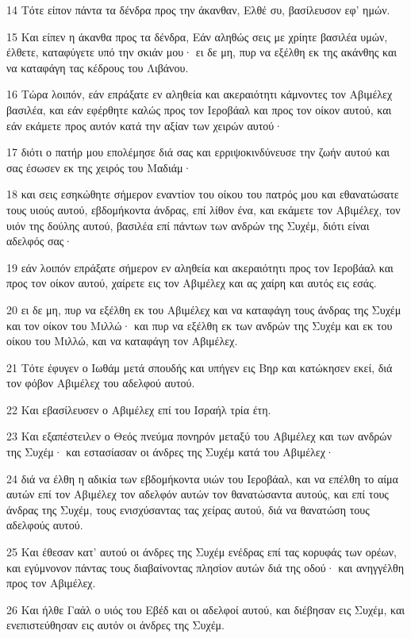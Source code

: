 \par 14 Τότε είπον πάντα τα δένδρα προς την άκανθαν, Ελθέ συ, βασίλευσον εφ' ημών.
\par 15 Και είπεν η άκανθα προς τα δένδρα, Εάν αληθώς σεις με χρίητε βασιλέα υμών, έλθετε, καταφύγετε υπό την σκιάν μου· ει δε μη, πυρ να εξέλθη εκ της ακάνθης και να καταφάγη τας κέδρους του Λιβάνου.
\par 16 Τώρα λοιπόν, εάν επράξατε εν αληθεία και ακεραιότητι κάμνοντες τον Αβιμέλεχ βασιλέα, και εάν εφέρθητε καλώς προς τον Ιεροβάαλ και προς τον οίκον αυτού, και εάν εκάμετε προς αυτόν κατά την αξίαν των χειρών αυτού·
\par 17 διότι ο πατήρ μου επολέμησε διά σας και ερριψοκινδύνευσε την ζωήν αυτού και σας έσωσεν εκ της χειρός του Μαδιάμ·
\par 18 και σεις εσηκώθητε σήμερον εναντίον του οίκου του πατρός μου και εθανατώσατε τους υιούς αυτού, εβδομήκοντα άνδρας, επί λίθον ένα, και εκάμετε τον Αβιμέλεχ, τον υιόν της δούλης αυτού, βασιλέα επί πάντων των ανδρών της Συχέμ, διότι είναι αδελφός σας·
\par 19 εάν λοιπόν επράξατε σήμερον εν αληθεία και ακεραιότητι προς τον Ιεροβάαλ και προς τον οίκον αυτού, χαίρετε εις τον Αβιμέλεχ και ας χαίρη και αυτός εις εσάς.
\par 20 ει δε μη, πυρ να εξέλθη εκ του Αβιμέλεχ και να καταφάγη τους άνδρας της Συχέμ και τον οίκον του Μιλλώ· και πυρ να εξέλθη εκ των ανδρών της Συχέμ και εκ του οίκου του Μιλλώ, και να καταφάγη τον Αβιμέλεχ.
\par 21 Τότε έφυγεν ο Ιωθάμ μετά σπουδής και υπήγεν εις Βηρ και κατώκησεν εκεί, διά τον φόβον Αβιμέλεχ του αδελφού αυτού.
\par 22 Και εβασίλευσεν ο Αβιμέλεχ επί του Ισραήλ τρία έτη.
\par 23 Και εξαπέστειλεν ο Θεός πνεύμα πονηρόν μεταξύ του Αβιμέλεχ και των ανδρών της Συχέμ· και εστασίασαν οι άνδρες της Συχέμ κατά του Αβιμέλεχ·
\par 24 διά να έλθη η αδικία των εβδομήκοντα υιών του Ιεροβάαλ, και να επέλθη το αίμα αυτών επί τον Αβιμέλεχ τον αδελφόν αυτών τον θανατώσαντα αυτούς, και επί τους άνδρας της Συχέμ, τους ενισχύσαντας τας χείρας αυτού, διά να θανατώση τους αδελφούς αυτού.
\par 25 Και έθεσαν κατ' αυτού οι άνδρες της Συχέμ ενέδρας επί τας κορυφάς των ορέων, και εγύμνονον πάντας τους διαβαίνοντας πλησίον αυτών διά της οδού· και ανηγγέλθη προς τον Αβιμέλεχ.
\par 26 Και ήλθε Γαάλ ο υιός του Εβέδ και οι αδελφοί αυτού, και διέβησαν εις Συχέμ, και ενεπιστεύθησαν εις αυτόν οι άνδρες της Συχέμ.
